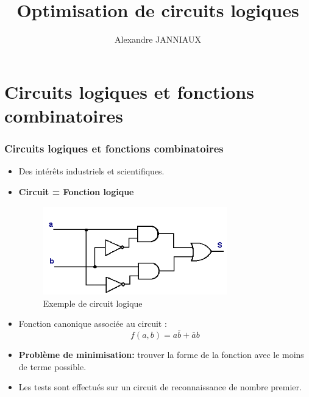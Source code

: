 \documentclass[handout]{beamer}
\title{Optimisation de circuits logiques}
\author{Alexandre JANNIAUX}
\date{}
\begin{document}
\begin{frame}
  \maketitle
  \tableofcontents
\end{frame}

\section{Circuits logiques et fonctions combinatoires}
\begin{frame}
  \frametitle{Circuits logiques et fonctions combinatoires}
  
  \begin{itemize}

   \item Des intérêts industriels et scientifiques.
   \vfill\null
  
   \item \textbf{Circuit = Fonction logique}
   \begin{figure}[p]
   \includegraphics[width=8cm]{circuit_logique2.png}
   \caption{Exemple de circuit logique }
   \label{fig:circ1}
  \end{figure}
  
  \item Fonction canonique associée au circuit : \[f(a,b) = a\bar{b} + \bar{a}b\]
  \vfill\null

  \item\textbf{Problème de minimisation: } trouver la forme de la fonction avec le moins de terme possible.
  \vfill\null
  
  
  \item Les tests sont effectués sur un circuit de reconnaissance de nombre premier.

\end{itemize}
\end{frame}
\end{document}
